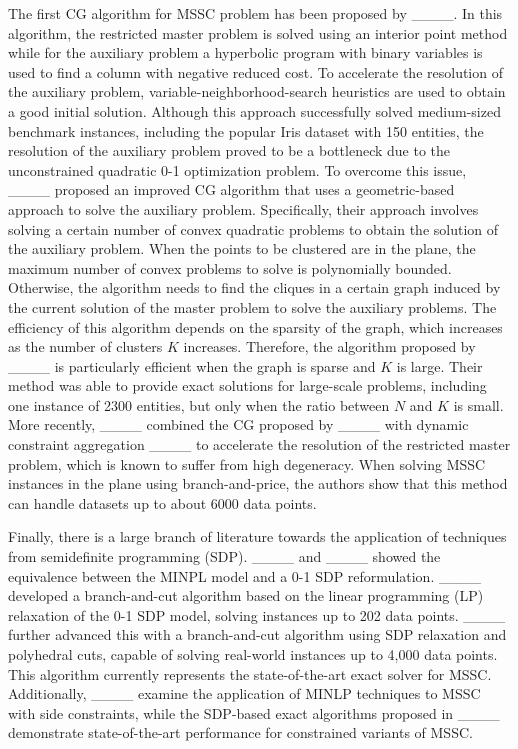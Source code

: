 The first CG algorithm for MSSC problem has been proposed by ____. In this algorithm, the restricted master problem is solved using an interior point method while for the auxiliary problem a hyperbolic program with binary variables is used to find a column with negative reduced cost. To accelerate the resolution of the auxiliary problem, variable-neighborhood-search heuristics are used to obtain a good initial solution. Although this approach successfully solved medium-sized benchmark instances, including the popular Iris dataset with 150 entities, the resolution of the auxiliary problem proved to be a bottleneck due to the unconstrained quadratic 0-1 optimization problem. To overcome this issue, ____ proposed an improved CG algorithm that uses a geometric-based approach to solve the auxiliary problem. Specifically, their approach involves solving a certain number of convex quadratic problems to obtain the solution of the auxiliary problem. When the points to be clustered are in the plane, the maximum number of convex problems to solve is polynomially bounded. Otherwise, the algorithm needs to find the cliques in a certain graph induced by the current solution of the master problem to solve the auxiliary problems. The efficiency of this algorithm depends on the sparsity of the graph, which increases as the number of clusters $K$ increases. Therefore, the algorithm proposed by ____ is particularly efficient when the graph is sparse and $K$ is large. Their method was able to provide exact solutions for large-scale problems, including one instance of 2300 entities, but only when the ratio between $N$ and $K$ is small. More recently, ____ combined the CG proposed by ____ with dynamic constraint aggregation ____ to accelerate the resolution of the restricted master problem, which is known to suffer from high degeneracy.  When solving MSSC instances in the plane using branch-and-price, the authors show that this method can handle datasets up to about 6000 data points.

Finally, there is a large branch of literature towards the application of techniques from semidefinite programming (SDP). ____ and ____ showed the equivalence between the MINPL model and a 0-1 SDP reformulation. ____ developed a branch-and-cut algorithm based on the linear programming (LP) relaxation of the 0-1 SDP model, solving instances up to 202 data points. ____ further advanced this with a branch-and-cut algorithm using SDP relaxation and polyhedral cuts, capable of solving real-world instances up to 4,000 data points. This algorithm currently represents the state-of-the-art exact solver for MSSC. Additionally, ____ examine the application of MINLP techniques to MSSC with side constraints, while the SDP-based exact algorithms proposed in ____ demonstrate state-of-the-art performance for constrained variants of MSSC.